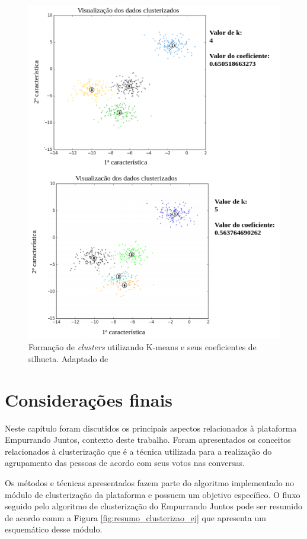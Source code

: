 \begin{figure}[bt!]
\centering
\includegraphics[scale=1]{figuras/exemplo_silhueta.png}
\caption{Formação de \textit{clusters} utilizando K-means e seus coeficientes de silhueta. Adaptado de }
\label{fig:exemplo_silhueta}
\end{figure}

\vfill
\pagebreak
\section{Considerações finais}

Neste capítulo foram discutidos os principais aspectos relacionados à plataforma Empurrando Juntos, contexto deste trabalho.
Foram apresentados os conceitos relacionados à clusterização que é a técnica utilizada para a realização do agrupamento 
das pessoas de acordo com seus votos nas conversas. 

Os métodos e técnicas apresentados fazem parte do algoritmo implementado no módulo de clusterização da plataforma 
e possuem um objetivo específico. O fluxo seguido pelo algoritmo de clusterização do Empurrando Juntos pode ser resumido de acordo comm
a Figura \ref{fig:resumo_clusterizao_ej} que apresenta um esquemático desse módulo.

